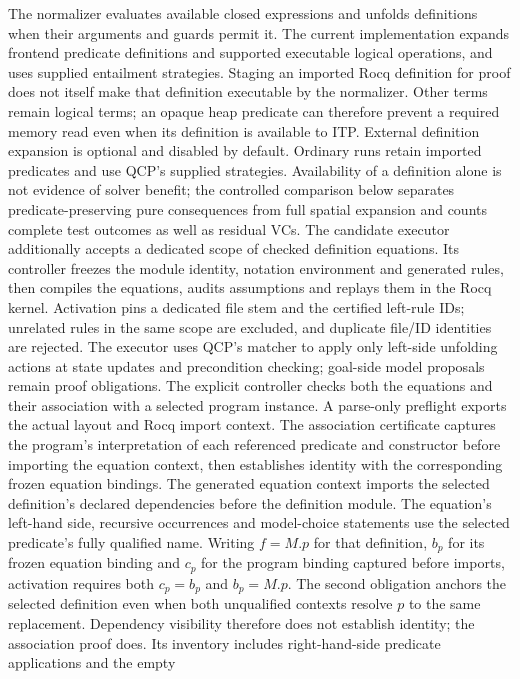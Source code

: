 The normalizer evaluates available closed expressions and unfolds definitions
when their arguments and guards permit it. The current implementation expands
frontend predicate definitions and supported executable logical operations,
and uses supplied entailment strategies. Staging an imported Rocq definition
for proof does not itself make that definition executable by the normalizer.
Other terms remain logical terms; an opaque heap predicate can therefore
prevent a required memory read even when its definition is available to ITP.
External definition expansion is optional and disabled by default. Ordinary
runs retain imported predicates and use QCP's supplied strategies. Availability
of a definition alone is not evidence of solver benefit; the controlled
comparison below separates predicate-preserving pure consequences from full
spatial expansion and counts complete test outcomes as well as residual VCs.
The candidate executor additionally accepts a dedicated scope of checked
definition equations. Its controller freezes the module identity, notation
environment and generated rules, then compiles the equations, audits assumptions
and replays them in the Rocq kernel. Activation pins a dedicated file stem and
the certified left-rule IDs; unrelated rules in the same scope are excluded,
and duplicate file/ID identities are rejected. The executor uses QCP's matcher to apply
only left-side unfolding actions at state updates and precondition checking;
goal-side model proposals remain proof obligations. The explicit controller
checks both the equations and their association with a selected program instance.
A parse-only preflight exports the actual layout and Rocq import context.
The association certificate captures the program's interpretation of each
referenced predicate and constructor before importing the equation context,
then establishes identity with the corresponding frozen equation bindings.
The generated equation context imports the selected definition's declared
dependencies before the definition module. The equation's left-hand side,
recursive occurrences and model-choice statements use the selected predicate's
fully qualified name. Writing $f=M.p$ for that definition, $b_p$ for its frozen
equation binding and $c_p$ for the program binding captured before imports,
activation requires both $c_p=b_p$ and $b_p=M.p$. The second obligation anchors
the selected definition even when both unqualified contexts resolve $p$ to the
same replacement. Dependency visibility therefore does not establish identity;
the association proof does.
Its inventory includes right-hand-side predicate applications and the empty
